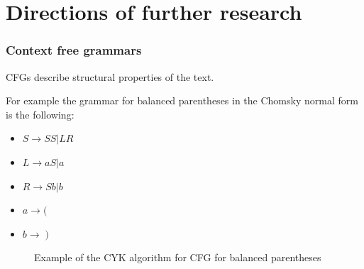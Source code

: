 \documentclass{beamer}
\begin{document}
\section{Directions of further research}
\begin{frame}
    \frametitle{Context free grammars}
    \begin{minipage}{0.49\textwidth}
        CFGs describe structural properties of the text.

        For example the grammar for balanced parentheses in the Chomsky normal form
        is the following:
        \begin{itemize}
            \item \( S \to SS | LR \)
            \item \( L \to aS | a \)
            \item \( R \to Sb | b \)
            \item \( a \to ( \)
            \item \( b \to \;) \)
        \end{itemize}
    \end{minipage}
    \begin{minipage}{0.49\textwidth}
        \begin{figure}
            \caption{Example of the CYK algorithm for CFG for balanced parentheses}
        \end{figure}
    \end{minipage}
\end{frame}
\end{document}
